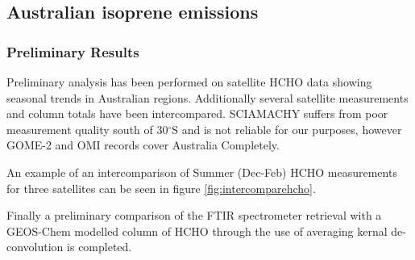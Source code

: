 \subsection{Australian isoprene emissions}

\subsubsection{Preliminary Results}

Preliminary analysis has been performed on satellite HCHO data showing seasonal trends in Australian regions.
Additionally several satellite measurements and column totals have been intercompared.
SCIAMACHY suffers from poor measurement quality south of 30$^{\circ}$S and is not reliable for our purposes, however GOME-2 and OMI records cover Australia Completely. 

An example of an intercomparison of Summer (Dec-Feb) HCHO measurements for three satellites can be seen in figure \ref{fig:intercomparehcho}.

Finally a preliminary comparison of the FTIR spectrometer retrieval with a GEOS-Chem modelled column of HCHO through the use of averaging kernal de-convolution is completed.